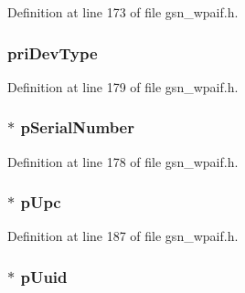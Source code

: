Definition at line 173 of file gsn\_\-wpaif.h.

\hypertarget{a00427_ae427de8cc9031fdd869fb8eef7930bab}{
\subsubsection[{priDevType}]{ {\bf priDevType}}}
\label{a00427_ae427de8cc9031fdd869fb8eef7930bab}


Definition at line 179 of file gsn\_\-wpaif.h.

\hypertarget{a00427_a22ea7e7af119a5bf1946646753205fd5}{
\subsubsection[{pSerialNumber}]{$\ast$ {\bf pSerialNumber}}}
\label{a00427_a22ea7e7af119a5bf1946646753205fd5}


Definition at line 178 of file gsn\_\-wpaif.h.

\hypertarget{a00427_a785807e9bd8686cba78d8fee5df61863}{
\subsubsection[{pUpc}]{$\ast$ {\bf pUpc}}}
\label{a00427_a785807e9bd8686cba78d8fee5df61863}


Definition at line 187 of file gsn\_\-wpaif.h.

\hypertarget{a00427_ac9629a29e7c03e9f6c8b93e2e31c4ca7}{
\subsubsection[{pUuid}]{$\ast$ {\bf pUuid}}}
\label{a00427_ac9629a29e7c03e9f6c8b93e2e31c4ca7}


